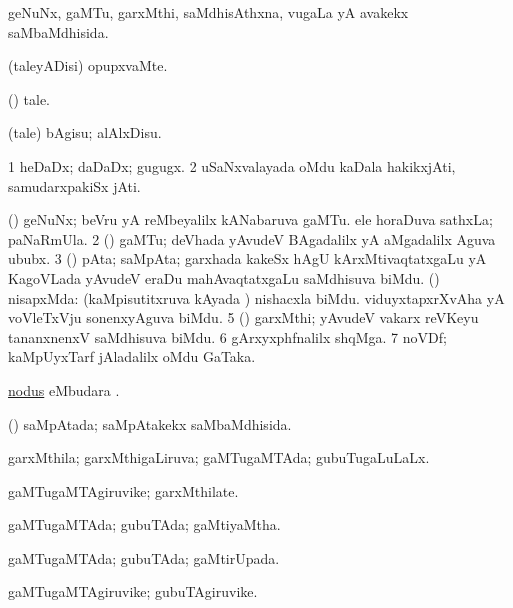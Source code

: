 \bentry
{}
\gl{\gu}
\bmng
geNuNx, gaMTu, garxMthi, saMdhisAthxna, \mo vugaLa yA avakekx saMbaMdhisida. 
\emng
\eentry

\bentry
{}
\gl{\kirxvi}
\bmng
(taleyADisi) opupxvaMte. 
\emng
\eentry

\bentry
{}
\gl{\nA}
\bmng
(\AmA) tale. 
\emng
\eentry

\bentry
{}
\gl{\sakirx}
\bmng
(tale) bAgisu; alAlxDisu. 
\emng
\eentry

\bentry
{}
\gl{\nA}
\bmng
\bnum
\num{1} heDaDx; daDaDx; gugugx. 
\num{2} uSaNxvalayada oMdu kaDala hakikxjAti, samudarxpakiSx jAti. 
\enum
\emng
\eentry

\bentry
{}
\gl{\nA}
\bmng
\bnum
{} (\savi) 
\banum
{} geNuNx; beVru yA reMbeyalilx kANabaruva gaMTu. 
 ele horaDuva sathxLa; paNaRmUla. 
\eanum
\numie
\num{2} (\aMrashA) gaMTu; deVhada yAvudeV BAgadalilx yA aMgadalilx Aguva ububx. 
\num{3} (\Kavi) pAta; saMpAta; garxhada kakeSx hAgU kArxMtivaqtatxgaLu yA KagoVLada yAvudeV eraDu mahAvaqtatxgaLu saMdhisuva biMdu. 
 (\Bwvi) nisapxMda: 
\banum
{} (kaMpisutitxruva kAyada \vi) nishacxla biMdu. 
 viduyxtapxrXvAha yA voVleTxVju sonenxyAguva biMdu. 
\eanum
\numie
\num{5} (\ga) garxMthi; yAvudeV vakarx reVKeyu tananxnenxV saMdhisuva biMdu. 
\num{6} gArxyxphfnalilx shqMga. 
\num{7} noVDf; kaMpUyxTarf jAladalilx oMdu GaTaka. 
\enum
\emng
\eentry

\bentry
{}
\gl{\nA}
\bmng
\hyperlink{nodus}{nodus} eMbudara \bava. 
\emng
\eentry

\bentry
{}
\gl{\gu}
\bmng
(\Kavi) saMpAtada; saMpAtakekx saMbaMdhisida. 
\emng
\eentry

\bentry
{}
\gl{\gu}
\bmng
garxMthila; garxMthigaLiruva; gaMTugaMTAda; gubuTugaLuLaLx. 
\emng
\eentry

\bentry
{}
\gl{\nA}
\bmng
gaMTugaMTAgiruvike; garxMthilate. 
\emng
\eentry

\bentry
{}
\gl{\gu}
\bmng
gaMTugaMTAda; gubuTAda; gaMtiyaMtha. 
\emng
\eentry

\bentry
{}
\gl{\gu}
\bmng
gaMTugaMTAda; gubuTAda; gaMtirUpada. 
\emng
\eentry

\bentry
{}
\gl{\nA}
\bmng
gaMTugaMTAgiruvike; gubuTAgiruvike. 
\emng
\eentry

